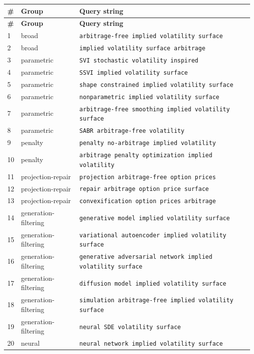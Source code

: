 \documentclass[11pt]{article}
\begin{document}
\begingroup
\begin{longtable}{@{}p{}p{}p{}@{}}
\toprule
\textbf{\#} & \textbf{Group} & \textbf{Query string} \\
\midrule
\endfirsthead
\toprule
\textbf{\#} & \textbf{Group} & \textbf{Query string} \\
\midrule
\endhead
1 & broad & \texttt{arbitrage-free implied volatility surface} \\
2 & broad & \texttt{implied volatility surface arbitrage} \\
3 & parametric & \texttt{SVI stochastic volatility inspired} \\
4 & parametric & \texttt{SSVI implied volatility surface} \\
5 & parametric & \texttt{shape constrained implied volatility surface} \\
6 & parametric & \texttt{nonparametric implied volatility surface} \\
7 & parametric & \texttt{arbitrage-free smoothing implied volatility surface} \\
8 & parametric & \texttt{SABR arbitrage-free volatility} \\
9 & penalty & \texttt{penalty no-arbitrage implied volatility} \\
10 & penalty & \texttt{arbitrage penalty optimization implied volatility} \\
11 & projection-repair & \texttt{projection arbitrage-free option prices} \\
12 & projection-repair & \texttt{repair arbitrage option price surface} \\
13 & projection-repair & \texttt{convexification option prices arbitrage} \\
14 & generation-filtering & \texttt{generative model implied volatility surface} \\
15 & generation-filtering & \texttt{variational autoencoder implied volatility surface} \\
16 & generation-filtering & \texttt{generative adversarial network implied volatility surface} \\
17 & generation-filtering & \texttt{diffusion model implied volatility surface} \\
18 & generation-filtering & \texttt{simulation arbitrage-free implied volatility surface} \\
19 & generation-filtering & \texttt{neural SDE volatility surface} \\
20 & neural & \texttt{neural network implied volatility surface} \\

\end{longtable}
\end{document}
